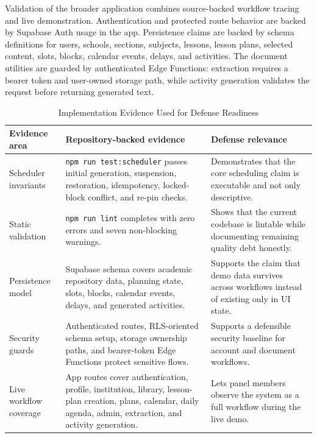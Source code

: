 \documentclass[conference]{IEEEtran}
\begin{document}
Validation of the broader application combines source-backed workflow tracing and
live demonstration. Authentication and protected route behavior are backed by
Supabase Auth usage in the app. Persistence claims are backed by schema definitions
for users, schools, sections, subjects, lessons, lesson plans, selected content,
slots, blocks, calendar events, delays, and activities. The document utilities are
guarded by authenticated Edge Functions: extraction requires a bearer token and
user-owned storage path, while activity generation validates the request before
returning generated text.

\begin{table}[t]
\centering
\caption{Implementation Evidence Used for Defense Readiness}
\label{tab:evidence}
\begin{tabular}{>{\raggedright\arraybackslash}p{}>{\raggedright\arraybackslash}p{}>{\raggedright\arraybackslash}p{}}
\toprule
Evidence area & Repository-backed evidence & Defense relevance \\
\midrule
Scheduler invariants & \texttt{npm run test:scheduler} passes initial generation, suspension, restoration, idempotency, locked-block conflict, and re-pin checks. & Demonstrates that the core scheduling claim is executable and not only descriptive. \\
\addlinespace
Static validation & \texttt{npm run lint} completes with zero errors and seven non-blocking warnings. & Shows that the current codebase is lintable while documenting remaining quality debt honestly. \\
\addlinespace
Persistence model & Supabase schema covers academic repository data, planning state, slots, blocks, calendar events, delays, and generated activities. & Supports the claim that demo data survives across workflows instead of existing only in UI state. \\
\addlinespace
Security guards & Authenticated routes, RLS-oriented schema setup, storage ownership paths, and bearer-token Edge Functions protect sensitive flows. & Supports a defensible security baseline for account and document workflows. \\
\addlinespace
Live workflow coverage & App routes cover authentication, profile, institution, library, lesson-plan creation, plans, calendar, daily agenda, admin, extraction, and activity generation. & Lets panel members observe the system as a full workflow during the live demo. \\
\bottomrule
\end{tabular}
\end{table}
\end{document}
